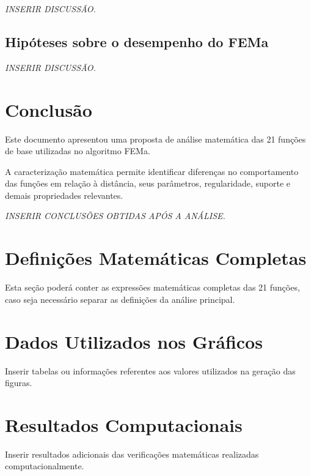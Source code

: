 \documentclass[12pt,a4paper]{article}
\begin{document}
	\textit{INSERIR DISCUSSÃO.}
	
	\subsection{Hipóteses sobre o desempenho do FEMa}
	
	\textit{INSERIR DISCUSSÃO.}
	
	
	\section{Conclusão}
	
	Este documento apresentou uma proposta de análise matemática das
	21 funções de base utilizadas no algoritmo FEMa.
	
	A caracterização matemática permite identificar diferenças no
	comportamento das funções em relação à distância, seus parâmetros,
	regularidade, suporte e demais propriedades relevantes.
	
	\textit{INSERIR CONCLUSÕES OBTIDAS APÓS A ANÁLISE.}
	
	
	\newpage
	
	\printbibliography
	
	
	\appendix
	
	\section{Definições Matemáticas Completas}
	
	Esta seção poderá conter as expressões matemáticas completas das
	21 funções, caso seja necessário separar as definições da análise
	principal.
	
	\section{Dados Utilizados nos Gráficos}
	
	Inserir tabelas ou informações referentes aos valores utilizados na
	geração das figuras.
	
	\section{Resultados Computacionais}
	
	Inserir resultados adicionais das verificações matemáticas realizadas
	computacionalmente.
	
\end{document}
